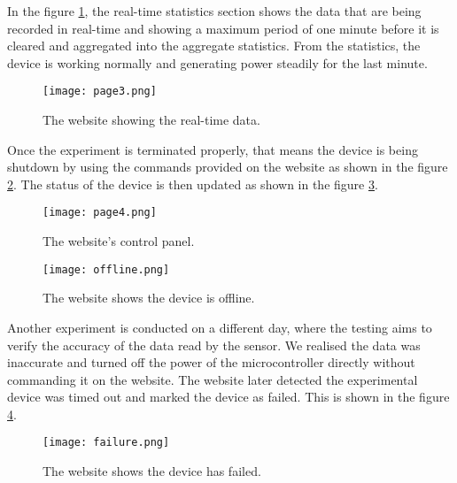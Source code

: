\documentclass[../thesis.tex]{subfiles}
\begin{document}
In the figure \ref{fig:page3}, the real-time statistics section shows the data that are being recorded in real-time and showing a maximum period of one minute before it is cleared and aggregated into the aggregate statistics. From the statistics, the device is working normally and generating power steadily for the last minute. 

\begin{figure}[!ht]
	\centering
	\texttt{[image: page3.png]}
	\caption{The website showing the real-time data.}
	\label{fig:page3}
\end{figure}


Once the experiment is terminated properly, that means the device is being shutdown by using the commands provided on the website as shown in the figure \ref{fig:page4}. The status of the device is then updated as shown in the figure \ref{fig:offline}. 

\begin{figure}[!ht]
	\centering
	\texttt{[image: page4.png]}
	\caption{The website's control panel.}
	\label{fig:page4}
\end{figure}

\begin{figure}[!ht]
	\centering
	\texttt{[image: offline.png]}
	\caption{The website shows the device is offline.}
	\label{fig:offline}
\end{figure}


Another experiment is conducted on a different day, where the testing aims to verify the accuracy of the data read by the sensor. We realised the data was inaccurate and turned off the power of the microcontroller directly without commanding it on the website. The website later detected the experimental device was timed out and marked the device as failed. This is shown in the figure \ref{fig:failure}.


\begin{figure}[!ht]
	\centering
	\texttt{[image: failure.png]}
	\caption{The website shows the device has failed.}
	\label{fig:failure}
\end{figure}
\end{document}
